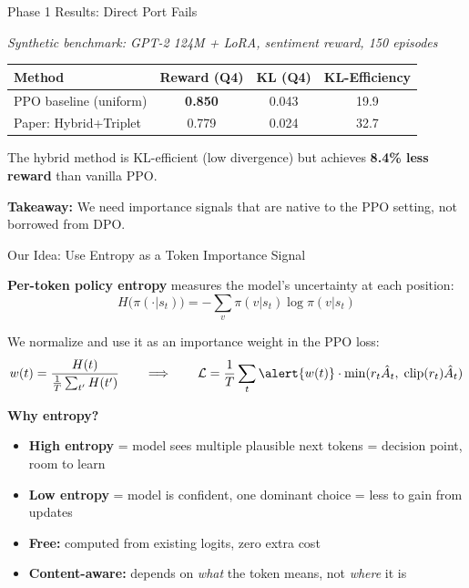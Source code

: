 \documentclass[aspectratio=169,10pt]{beamer}
\begin{document}
\begin{frame}{Phase 1 Results: Direct Port Fails}

\textit{\scriptsize Synthetic benchmark: GPT-2 124M + LoRA, sentiment reward, 150 episodes}
\begin{table}
\begin{tabular}{lccc}
\toprule
Method & Reward (Q4) & KL (Q4) & KL-Efficiency \\
\midrule
PPO baseline (uniform) & \textbf{0.850} & 0.043 & 19.9 \\
Paper: Hybrid+Triplet & 0.779 & 0.024 & 32.7 \\
\bottomrule
\end{tabular}
\end{table}

\vspace{0.3cm}
The hybrid method is KL-efficient (low divergence) but achieves \textbf{8.4\% less reward} than vanilla PPO.

\vspace{0.3cm}
\textbf{Takeaway:} We need importance signals that are native to the PPO setting, not borrowed from DPO.

\end{frame}

\begin{frame}{Our Idea: Use Entropy as a Token Importance Signal}

\textbf{Per-token policy entropy} measures the model's uncertainty at each position:
\[
H\bigl(\pi(\cdot | s_t)\bigr) = -\sum_v \pi(v|s_t) \log \pi(v|s_t)
\]

We normalize and use it as an importance weight in the PPO loss:
\[
w(t) = \frac{H(t)}{\frac{1}{T}\sum_{t'} H(t')} \qquad \Longrightarrow \qquad \mathcal{L} = \frac{1}{T}\sum_t \alert{w(t)} \cdot \min(r_t \hat{A}_t,\;\text{clip}(r_t)\hat{A}_t)
\]

\textbf{Why entropy?}
\begin{itemize}
    \item \textbf{High entropy} = model sees multiple plausible next tokens = \textcolor{good}{decision point, room to learn}
    \item \textbf{Low entropy} = model is confident, one dominant choice = less to gain from updates
    \item \textbf{Free:} computed from existing logits, zero extra cost
    \item \textbf{Content-aware:} depends on \textit{what} the token means, not \textit{where} it is
\end{itemize}

\end{frame}
\end{document}
